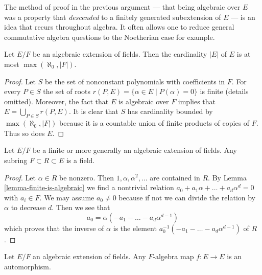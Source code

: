 \noindent
The method of proof in the previous argument --- that being algebraic
over $E$ was a property that {\it descended} to a finitely generated
subextension of $E$ --- is an idea that recurs throughout algebra.
It often allows one to reduce general commutative algebra questions
to the Noetherian case for example.

\begin{lemma}
\label{lemma-size-algebraic-extension}
Let $E/F$ be an algebraic extension of fields. Then the cardinality $|E|$
of $E$ is at most $\max(\aleph_0, |F|)$.
\end{lemma}

\begin{proof}
Let $S$ be the set of nonconstant polynomials with coefficients in $F$.
For every $P \in S$ the set of roots
$r(P, E) = \{\alpha \in E \mid P(\alpha) = 0\}$
is finite (details omitted). Moreover, the fact that $E$ is algebraic
over $F$ implies that $E = \bigcup_{P \in S} r(P, E)$.
It is clear that $S$ has cardinality bounded by $\max(\aleph_0, |F|)$
because it is a countable union of finite products of copies of $F$.
Thus so does $E$.
\end{proof}

\begin{lemma}
\label{lemma-subalgebra-algebraic-extension-field}
Let $E/F$ be a finite or more generally an algebraic extension of fields.
Any subring $F \subset R \subset E$ is a field.
\end{lemma}

\begin{proof}
Let $\alpha \in R$ be nonzero. Then $1, \alpha, \alpha^2, \ldots$
are contained in $R$. By Lemma \ref{lemma-finite-is-algebraic}
we find a nontrivial relation
$a_0 + a_1 \alpha + \ldots + a_d \alpha^d = 0$ with $a_i \in F$.
We may assume $a_0 \not = 0$ because if not we can divide the relation
by $\alpha$ to decrease $d$. Then we see that
$$
a_0 = \alpha (- a_1  - \ldots - a_d \alpha^{d - 1})
$$
which proves that the inverse of $\alpha$ is the element
$a_0^{-1} (- a_1  - \ldots - a_d \alpha^{d - 1})$
of $R$.
\end{proof}

\begin{lemma}
\label{lemma-algebraic-extension-self-map}
Let $E/F$ an algebraic extension of fields. Any $F$-algebra map
$f : E \to E$ is an automorphism.
\end{lemma}

